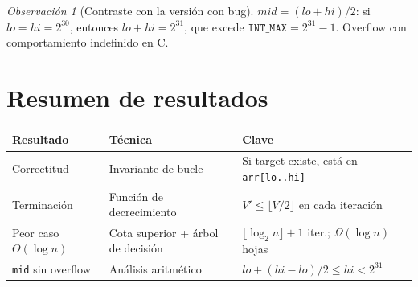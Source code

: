 \documentclass[11pt, letterpaper]{article}
\theoremstyle{definition}
\theoremstyle{plain}
\theoremstyle{remark}
\newtheorem{remark}{Observación}[section]
\begin{document}
\begin{remark}[Contraste con la versión con bug]
$\mathit{mid} = (\mathit{lo} + \mathit{hi})/2$: si
$\mathit{lo} = \mathit{hi} = 2^{30}$, entonces
$\mathit{lo} + \mathit{hi} = 2^{31}$, que excede
$\texttt{INT\_MAX} = 2^{31} - 1$. Overflow con comportamiento
indefinido en C.
\end{remark}

\section{Resumen de resultados}

\begin{table}[h]
\centering
\begin{tabular}{llp{5.5cm}}
\toprule
\textbf{Resultado} & \textbf{Técnica} & \textbf{Clave} \\
\midrule
Correctitud
  & Invariante de bucle
  & Si target existe, está en \texttt{arr[lo..hi]} \\
Terminación
  & Función de decrecimiento
  & $V' \leq \lfloor V/2 \rfloor$ en cada iteración \\
Peor caso $\Theta(\log n)$
  & Cota superior + árbol de decisión
  & $\lfloor\log_2 n\rfloor + 1$ iter.; $\Omega(\log n)$ hojas \\
\texttt{mid} sin overflow
  & Análisis aritmético
  & $\mathit{lo} + (\mathit{hi}{-}\mathit{lo})/2 \leq \mathit{hi} < 2^{31}$ \\
\bottomrule
\end{tabular}
\end{table}
\end{document}

